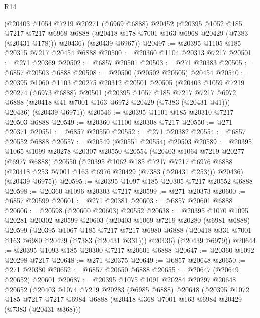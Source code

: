 \begin{lexlean}{R14}
\begin{coremodule}
    (@20403
      @1054
      @7219
      @20271
      (@6969 @6888)
      @20452
      (@20395
        @1052
        @185
        @7217
        @7217
        @6968
        @6888
        (@20418 @178 @7001 @163 @6968 @20429 (@7383 (@20431 @178)))
        @20436)
      (@20439 @6967))
@20497 := @20395 @1105 @185 @20315 @7217 @20454 @6888
@20500 := @20360 @1104 @20313 @7217
@20501 := @271 @20369
@20502 := @6857 @20501
@20503 := @271 @20383
@20505 := @6857 @20503 @6888
@20508 := @20500 (@20502 @20505) @20454
@20540 := @20395
    @1060
    @1103
    @20275
    @20312
    @20501
    @20505
    (@20403
      @1059
      @7219
      @20274
      (@6973 @6888)
      @20501
      (@20395
        @1057
        @185
        @7217
        @7217
        @6972
        @6888
        (@20418 @41 @7001 @163 @6972 @20429 (@7383 (@20431 @41)))
        @20436)
      (@20439 @6971))
@20546 := @20395 @1101 @185 @20310 @7217 @20503 @6888
@20549 := @20360 @1100 @20308 @7217
@20550 := @271 @20371
@20551 := @6857 @20550
@20552 := @271 @20382
@20554 := @6857 @20552 @6888
@20557 := @20549 (@20551 @20554) @20503
@20589 := @20395
    @1065
    @1099
    @20278
    @20307
    @20550
    @20554
    (@20403
      @1064
      @7219
      @20277
      (@6977 @6888)
      @20550
      (@20395
        @1062
        @185
        @7217
        @7217
        @6976
        @6888
        (@20418 @253 @7001 @163 @6976 @20429 (@7383 (@20431 @253)))
        @20436)
      (@20439 @6975))
@20595 := @20395 @1097 @185 @20305 @7217 @20552 @6888
@20598 := @20360 @1096 @20303 @7217
@20599 := @271 @20373
@20600 := @6857 @20599
@20601 := @271 @20381
@20603 := @6857 @20601 @6888
@20606 := @20598 (@20600 @20603) @20552
@20638 := @20395
    @1070
    @1095
    @20281
    @20302
    @20599
    @20603
    (@20403
      @1069
      @7219
      @20280
      (@6981 @6888)
      @20599
      (@20395
        @1067
        @185
        @7217
        @7217
        @6980
        @6888
        (@20418 @331 @7001 @163 @6980 @20429 (@7383 (@20431 @331)))
        @20436)
      (@20439 @6979))
@20644 := @20395 @1093 @185 @20300 @7217 @20601 @6888
@20647 := @20360 @1092 @20298 @7217
@20648 := @271 @20375
@20649 := @6857 @20648
@20650 := @271 @20380
@20652 := @6857 @20650 @6888
@20655 := @20647 (@20649 @20652) @20601
@20687 := @20395
    @1075
    @1091
    @20284
    @20297
    @20648
    @20652
    (@20403
      @1074
      @7219
      @20283
      (@6985 @6888)
      @20648
      (@20395
        @1072
        @185
        @7217
        @7217
        @6984
        @6888
        (@20418 @368 @7001 @163 @6984 @20429 (@7383 (@20431 @368)))

\end{coremodule}
\end{lexlean}

